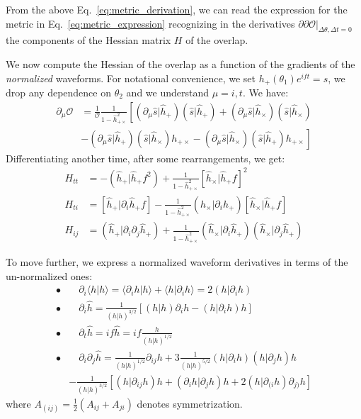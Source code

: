 \documentclass[twocolumn,showpacs,preprintnumbers,nofootinbib,prd,
superscriptaddress,10pt]{revtex4-2}
\newcommand{\scalar}[2]{\langle #1|#2 \rangle}
\newcommand{\rescalar}[2]{( #1 |#2 )}
\newcommand{\imscalar}[2]{[ #1|#2 ]}
\begin{document}
From the above Eq.~\eqref{eq:metric_derivation}, we can read the expression for the metric in Eq.~\eqref{eq:metric_expression} recognizing in the derivatives $\partial\partial\mathcal{O}|_{\Delta\theta, \Delta t = 0}$ the components of the Hessian matrix $H$ of the overlap.

We now compute the Hessian of the overlap as a function of the gradients of the {\it normalized} waveforms. For notational convenience, we set $h_+(\theta_1)e^{ift} = s$, we drop any dependence on $\theta_2$ and we understand $\mu = {i, t}$.
We have:
\begin{align}\label{eq:overlap_grads}
	\partial_{\mu} \mathcal{O} &= \frac{1}{\mathcal{O}} \frac{1}{1-\hat{h}^2_{+\times}}
	\left[
	\rescalar{\partial_\mu\hat{s}}{\hat{h}_+}\rescalar{\hat{s}}{\hat{h}_+} 
	+ \rescalar{\partial_\mu\hat{s}}{\hat{h}_\times}\rescalar{\hat{s}}{\hat{h}_\times} \right. \nonumber \\
	&\left. - \rescalar{\partial_\mu\hat{s}}{\hat{h}_+}\rescalar{\hat{s}}{\hat{h}_\times}h_{+\times}
	- \rescalar{\partial_\mu\hat{s}}{\hat{h}_\times}\rescalar{\hat{s}}{\hat{h}_+}h_{+\times}
	\right]
\end{align}
Differentiating another time, after some rearrangements, we get:
\begin{align}
H_{tt} &= - \rescalar{\hat{h}_+}{\hat{h}_+f^2}
			+ \frac{1}{1-\hat{h}^2_{+\times}} \imscalar{\hat{h}_\times}{\hat{h}_+f}^2 \label{eq:H_tt}\\
H_{ti} &= \imscalar{\hat{h}_+}{\partial_i \hat{h}_+f}
			- \frac{1}{1-\hat{h}^2_{+\times}} \rescalar{\hat{h}_\times}{\partial_i\hat{h}_+} \imscalar{\hat{h}_\times}{\hat{h}_+f} \label{eq:H_ti}\\
H_{ij} &= \rescalar{\hat{h}_+}{\partial_i\partial_j\hat{h}_+}
			+ \frac{1}{1-\hat{h}^2_{+\times}} \rescalar{\hat{h}_\times}{\partial_i\hat{h}_+} \rescalar{\hat{h}_\times}{\partial_j\hat{h}_+} \label{eq:H_ij}
\end{align}

To move further, we express a normalized waveform derivatives in terms of the un-normalized ones:
\begin{align*}
	\bullet&\quad \partial_i \scalar{h}{h} = \scalar{\partial_i h}{h}+ \scalar{h}{\partial_i h} = 2 \rescalar{h}{\partial_i h} \\
	\bullet&\quad \partial_i \hat{h} =\frac{1}{\rescalar{h}{h}^{3/2}} \left[ \rescalar{h}{h}\partial_i h -  \rescalar{h}{\partial_i h} h \right]
	\\
	\bullet &\quad \partial_t \hat{h} = i f \hat{h} = i f \frac{h}{\rescalar{h}{h}^{1/2}} \\
	\bullet &\quad \partial_i \partial_j \hat{h} = \frac{1}{\rescalar{h}{h}^{1/2}} \partial_{ij}h 	+3 \frac{1}{\rescalar{h}{h}^{5/2}} \rescalar{h}{\partial_i h}\rescalar{h}{\partial_j h}h \\
	&- \frac{1}{\rescalar{h}{h}^{3/2}} \left[\rescalar{h}{ \partial_{ij} h} h + \rescalar{\partial_i h}{\partial_j h}  h
		+2\rescalar{h}{\partial_{(i} h} \partial_{j)} h \right]
\end{align*}
where $A_{(ij)} = \frac{1}{2}(A_{ij}+A_{ji})$ denotes symmetrization.
\end{document}
